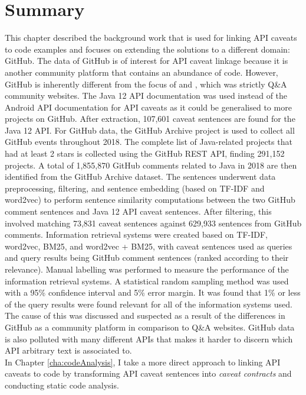 \section{Summary}
\label{sec:info-summary}
This chapter described the background work that is used for linking API caveats to code examples and focuses on extending the solutions to a different domain: GitHub. The data of GitHub is of interest for API caveat linkage because it is another community platform that contains an abundance of code. However, GitHub is inherently different from the focus of \cite{jiamou} and \cite{xiaoxue}, which was strictly Q\&A community websites. The Java 12 API documentation was used instead of the Android API documentation for API caveats as it could be generalised to more projects on GitHub. After extraction, 107,601
caveat sentences are found for the Java 12 API. For GitHub data, the GitHub Archive project is used to collect all GitHub events throughout 2018. The complete list of Java-related projects that had at least 2 stars is collected using the GitHub REST API, finding 291,152 projects. A total of 1,855,870 GitHub comments related to Java in 2018 are then identified from the GitHub Archive dataset. The sentences underwent data preprocessing, filtering, and sentence embedding (based on TF-IDF and word2vec) to perform sentence similarity computations between the two GitHub comment sentences and Java 12 API caveat sentences. After filtering, this involved matching 73,831 caveat sentences against 629,933 sentences from GitHub comments.
Information retrieval systems were created based on TF-IDF, word2vec, BM25, and word2vec + BM25, with caveat sentences used as queries and query results being GitHub comment sentences (ranked according to their relevance). Manual labelling was performed to measure the performance of the information retrieval systems. A statistical random sampling method was used with a 95\% confidence interval and 5\% error margin. It was found that 1\% or less of the query results were found relevant for all of the information systems used. The cause of this was discussed and suspected as a result of the differences in GitHub as a community platform in comparison to Q\&A websites. GitHub data is also polluted with many different APIs that makes it harder to discern which API arbitrary text is associated to.\\
In Chapter \ref{cha:codeAnalysis}, I take a more direct approach to linking API caveats to code by transforming API caveat sentences into \textit{caveat contracts} and conducting static code analysis.
